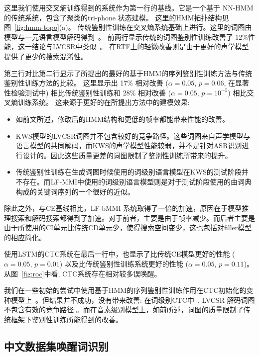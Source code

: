 这里我们使用交叉熵训练得到的系统作为第一行的基线。它是一个基于 NN-HMM 的传统系统，包含了聚类的tri-phone 状态建模。 这里的HMM拓扑结构见图~\ref{fig:hmm-topo}(a)。
传统鉴别性训练在交叉熵系统基础上进行。这里的词图由模型与一元语言模型解码得到~\cite{povey2007evaluation}。
前两行显示传统的词图鉴别性训练改善了 12\%性能，这一结论与LVCSR中类似~\cite{povey2005discriminative}。 在RTF上的轻微改善则是由于更好的声学模型提供了更少的搜索混淆性。

第三行对比第二行显示了所提出的最好的基于HMM的序列鉴别性训练方法与传统鉴别性训练方法的比较。
这里显示出 17\% 相对改善 ($\alpha = 0.05$, $p = 0.06$, 在显著性检验测试中) 相比传统鉴别性训练和 28\% 相对改善 ($\alpha = 0.05$, $p = 10^{-5}$)  相比交叉熵训练系统。
这来源于更好的在所提出方法中的建模效果:
\begin{itemize}
 \item 如前文所述，修改后的HMM结构和更低的帧率都能带来性能的改善。
 \item KWS模型的LVCSR词图并不包含较好的竞争路径。这些词图来自声学模型与语言模型的共同解码，而KWS的声学模型性能较弱，并不是针对ASR识别进行设计的。因此这些质量更差的词图限制了鉴别性训练所带来的提升。
 \item 传统鉴别性训练在生成词图时候使用的词级别语言模型在KWS的测试阶段并不存在。而LF-MMI中使用的词级别语言模型则是对于测试阶段使用的由词典构成的关键词序列的一个很好的近似。
\end{itemize}
除此之外，与CE基线相比，LF-bMMI 系统取得了一倍的加速，原因在于模型推理搜索和解码搜索都得到了加速。对于前者，主要是由于帧率减少。而后者主要是由于所使用的CI单元比传统CD单元少，使得搜索空间变少，这也包括对filler模型的相应简化。

使用LSTM的CTC系统在最后一行中，也显示了比传统CE模型更好的性能 ($\alpha = 0.05$, $p = 0.01$) 以及比传统鉴别性训练系统更好的性能 ($\alpha = 0.05$, $p = 0.11$)。 从图~\ref{fig:roc}中看, CTC系统存在相对较多误唤醒。

我们在一些初始的尝试中使用基于HMM的序列鉴别性训练作用在CTC初始化的变种模型上~\cite{sak2015fast,nict-icassp17}。但结果并不成功，没有带来改善: 在词级别CTC中~\cite{li2018developing}, LVCSR 解码词图不包含有效的竞争路径 。而在音素级别模型上，如前所述，词图的质量限制了传统框架下鉴别性训练所能得到的改善。%

\subsection{中文数据集唤醒词识别}
\label{Sec:exp-wakeup-word-rec}
